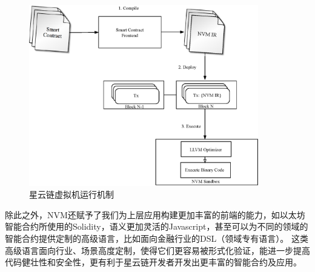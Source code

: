 \begin{figure}[h]
\centering
\includegraphics[width=10cm]{./figs/nvm-process}
\caption{星云链虚拟机运行机制}
\label{fig:nvm-process}
\end{figure}

除此之外，NVM还赋予了我们为上层应用构建更加丰富的前端的能力，如以太坊智能合约所使用的Solidity，语义更加灵活的Javascript，甚至可以为不同的领域的智能合约提供定制的高级语言，比如面向金融行业的DSL（领域专有语言）。 这类高级语言面向行业、场景高度定制，使得它们更容易被形式化验证，能进一步提高代码健壮性和安全性，更有利于星云链开发者开发出更丰富的智能合约及应用。
